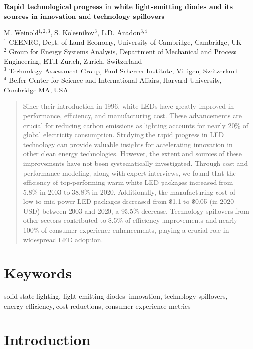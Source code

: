 \documentclass[parskip=full]{article}
\begin{document}
\begin{center}
    \large
    \textbf{Rapid technological progress in white light-emitting diodes and its sources in innovation and technology spillovers}
\end{center}

M. Weinold$^{1,2,3}$, S. Kolesnikov$^3$, L.D. Anadon$^{3,4}$ \\
\newline
$^1$ CEENRG, Dept. of Land Economy, University of Cambridge, Cambridge,  UK \\
$^2$ Group for Energy Systems Analysis, Department of Mechanical and Process Engineering, ETH Zurich, Zurich, Switzerland \\
$^3$ Technology Assessment Group, Paul Scherrer Institute, Villigen, Switzerland \\
$^4$ Belfer Center for Science and International Affairs, Harvard University, Cambridge MA, USA

\begin{abstract}
  Since their introduction in 1996, white LEDs have greatly improved in performance, efficiency, and manufacturing cost. These advancements are crucial for reducing carbon emissions as lighting accounts for nearly 20\% of global electricity consumption. Studying the rapid progress in LED technology can provide valuable insights for accelerating innovation in other clean energy technologies. However, the extent and sources of these improvements have not been systematically investigated. Through cost and performance modeling, along with expert interviews, we found that the efficiency of top-performing warm white LED packages increased from 5.8\% in 2003 to 38.8\% in 2020. Additionally, the manufacturing cost of low-to-mid-power LED packages decreased from \$1.1 to \$0.05 (in 2020 USD) between 2003 and 2020, a 95.5\% decrease. Technology spillovers from other sectors contributed to 8.5\% of efficiency improvements and nearly 100\% of consumer experience enhancements, playing a crucial role in widespread LED adoption.
\end{abstract}

\section*{Keywords}

solid-state lighting, light emitting diodes, innovation, technology spillovers, energy efficiency, cost reductions, consumer experience metrics

\section{Introduction}
\label{sec:intro}
\end{document}
